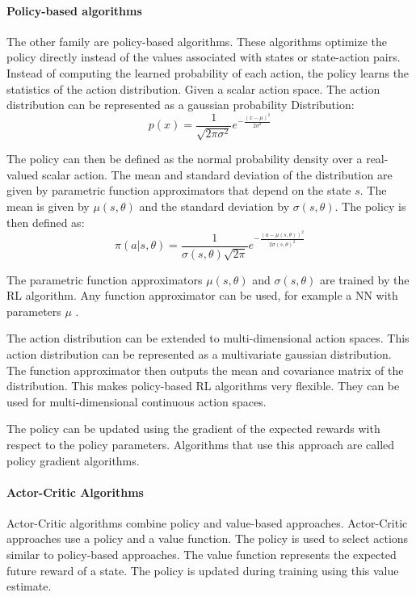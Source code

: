 \paragraph{Policy-based algorithms}
The other family are policy-based algorithms. These algorithms optimize the policy directly instead of the values associated with states or state-action pairs. Instead of computing the learned probability of each action, the policy learns the statistics of the action distribution.
Given a scalar action space. The action distribution can be represented as a gaussian probability Distribution:
\[p(x) = \frac{1}{\sqrt{2\pi\sigma^2}} e^{-\frac{(x-\mu)^2}{2\sigma^2}}\]

The policy can then be defined as the normal probability density over a real-valued scalar action. The mean and standard deviation of the distribution are given by parametric function approximators that depend on the state $s$. The mean is given by $\mu(s, \theta)$ and the standard deviation by $\sigma(s, \theta)$. The policy is then defined as:
\[\pi(a|s, \theta) = \frac{1}{\sigma(s, \theta)\sqrt{2\pi}} e^{-\frac{(a-\mu(s, \theta))^2}{2\sigma(s,\theta)^2}}\]

The parametric function approximators $\mu(s, \theta)$ and $\sigma(s, \theta)$ are trained by the \ac{RL} algorithm. Any function approximator can be used, for example a \ac{NN} with parameters $\mu$ \textcite{rlbook2020}. 

The action distribution can be extended to multi-dimensional action spaces. This action distribution can be represented as a multivariate gaussian distribution. The function approximator then outputs the mean and covariance matrix of the distribution. This makes policy-based \ac{RL} algorithms very flexible. They can be used for multi-dimensional continuous action spaces.

The policy can be updated using the gradient of the expected rewards with respect to the policy parameters. Algorithms that use this approach are called policy gradient algorithms.


\paragraph{Actor-Critic Algorithms}
Actor-Critic algorithms combine policy and value-based approaches. Actor-Critic approaches use a policy and a value function. The policy is used to select actions similar to policy-based approaches. The value function represents the expected future reward of a state. The policy is updated during training using this value estimate.

